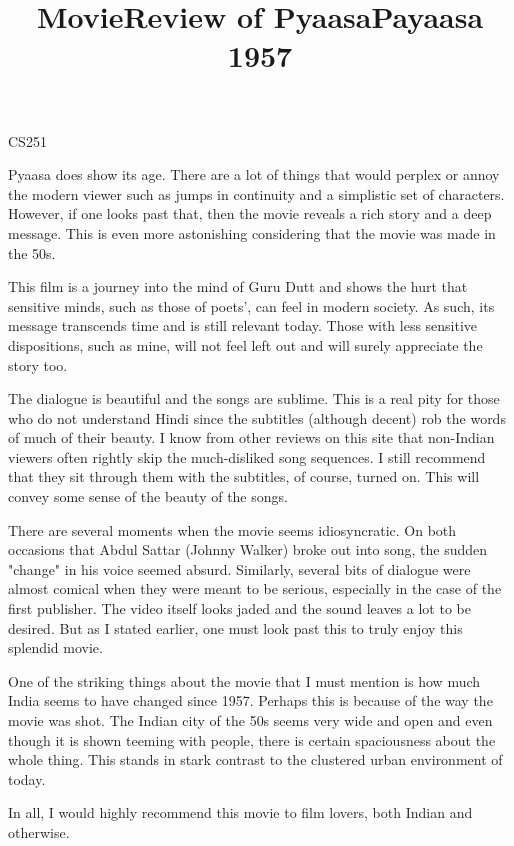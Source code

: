 \documentclass{article}
\begin{document}
\title{MovieReview of Pyaasa}


\centerline{\sc \large CS251}
\vspace{.5pc}
\centerline{\sc }
\vspace{2pc}
\title{Payaasa 1957}

Pyaasa does show its age. There are a lot of things that would perplex or annoy the modern viewer such as jumps in continuity and a simplistic set of characters. However, if one looks past that, then the movie reveals a rich story and a deep message. This is even more astonishing considering that the movie was made in the 50s.

This film is a journey into the mind of Guru Dutt and shows the hurt that sensitive minds, such as those of poets', can feel in modern society. As such, its message transcends time and is still relevant today. Those with less sensitive dispositions, such as mine, will not feel left out and will surely appreciate the story too.

The dialogue is beautiful and the songs are sublime. This is a real pity for those who do not understand Hindi since the subtitles (although decent) rob the words of much of their beauty. I know from other reviews on this site that non-Indian viewers often rightly skip the much-disliked song sequences. I still recommend that they sit through them with the subtitles, of course, turned on. This will convey some sense of the beauty of the songs.

There are several moments when the movie seems idiosyncratic. On both occasions that Abdul Sattar (Johnny Walker) broke out into song, the sudden "change" in his voice seemed absurd. Similarly, several bits of dialogue were almost comical when they were meant to be serious, especially in the case of the first publisher. The video itself looks jaded and the sound leaves a lot to be desired. But as I stated earlier, one must look past this to truly enjoy this splendid movie.

One of the striking things about the movie that I must mention is how much India seems to have changed since 1957. Perhaps this is because of the way the movie was shot. The Indian city of the 50s seems very wide and open and even though it is shown teeming with people, there is certain spaciousness about the whole thing. This stands in stark contrast to the clustered urban environment of today.

In all, I would highly recommend this movie to film lovers, both Indian and otherwise.
\end{document}

